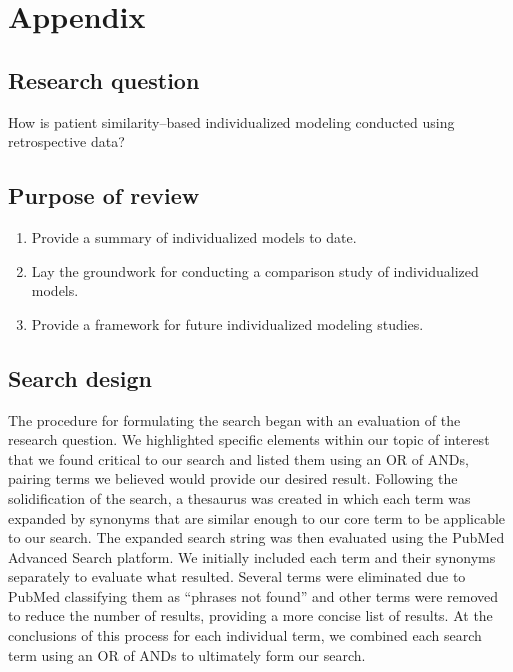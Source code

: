 \documentclass{article}
\providecommand{\tightlist}{%
  \setlength{\itemsep}{0pt}\setlength{\parskip}{0pt}}
\begin{document}
\pagebreak

\hypertarget{appendix}{%
\section*{Appendix}\label{appendix}}

\hypertarget{research-question}{%
\subsection*{Research question}\label{research-question}}

How is patient similarity--based individualized modeling conducted using
retrospective data?

\hypertarget{purpose-of-review}{%
\subsection*{Purpose of review}\label{purpose-of-review}}

\begin{enumerate}
\def\labelenumi{\arabic{enumi}.}
\tightlist
\item
  Provide a summary of individualized models to date.
\item
  Lay the groundwork for conducting a comparison study of individualized
  models.
\item
  Provide a framework for future individualized modeling studies.
\end{enumerate}

\hypertarget{search-design}{%
\subsection*{Search design}\label{search-design}}

The procedure for formulating the search began with an evaluation of the
research question. We highlighted specific elements within our topic of
interest that we found critical to our search and listed them using an
OR of ANDs, pairing terms we believed would provide our desired result.
Following the solidification of the search, a thesaurus was created in
which each term was expanded by synonyms that are similar enough to our
core term to be applicable to our search. The expanded search string was
then evaluated using the PubMed Advanced Search platform. We initially
included each term and their synonyms separately to evaluate what
resulted. Several terms were eliminated due to PubMed classifying them
as ``phrases not found'' and other terms were removed to reduce the
number of results, providing a more concise list of results. At the
conclusions of this process for each individual term, we combined each
search term using an OR of ANDs to ultimately form our search.
\end{document}
